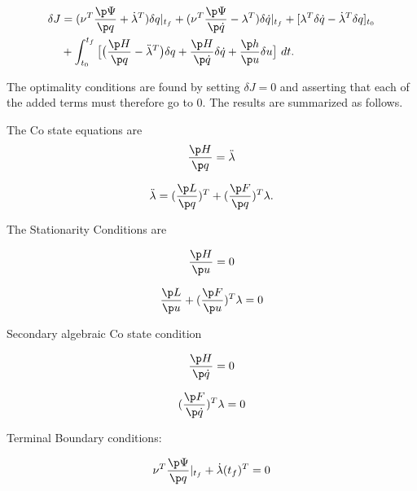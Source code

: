 \begin{equation}
\begin{split}
    \delta J &= (\nu^T\frac{\p \Psi}{\p q} + \dot \lambda^T) \delta q |_{t_f}
                 + (\nu^T\frac{\p \Psi}{\p \dot q} - \lambda^T) \delta \dot q |_{t_f}
                 +  [ \lambda^T  \delta \dot q - \dot \lambda^T \delta q]_{t_0}\\
              & + \int_{t_0}^{t_f} \big[ \big( \frac{\p H}{\p q} - \ddot \lambda^T \big) \delta q
                                              + \frac{\p H}{\p \dot q} \delta \dot q +  \frac{\p h}{\p u} \delta u \big] \text{  } dt.\\
\end{split}
\end{equation}


The optimality conditions are found by setting $\delta J = 0 $ and asserting that each of the added terms must therefore go to 0. The results are summarized as follows.

The Co state equations are
\begin{equation}
    \label{costate}
    \frac{\p H}{ \p q } = \ddot \lambda 
\end{equation}

\begin{equation}
    \ddot \lambda = ( \frac{\p L}{\p q}  )^T + ( \frac{\p F}{\p q} )^T \lambda .
\end{equation}

The Stationarity Conditions are

\begin{equation}
    \frac{\p H}{\p u} = 0 
\end{equation}

\begin{equation}
    \frac{\p L}{\p u} +( \frac{\p F}{\p u} )^T \lambda = 0
\end{equation}



Secondary algebraic Co state condition

\begin{equation}
    \frac{\p H}{\p \dot q} = 0
\end{equation}

\begin{equation}
    (\frac{\p F}{\p \dot q})^T \lambda = 0 
\end{equation}


Terminal Boundary conditions:

\begin{equation}
    \nu^T \frac{\p \Psi}{\p q}|_{t_f} + \dot \lambda(t_f)^T = 0
\end{equation}

